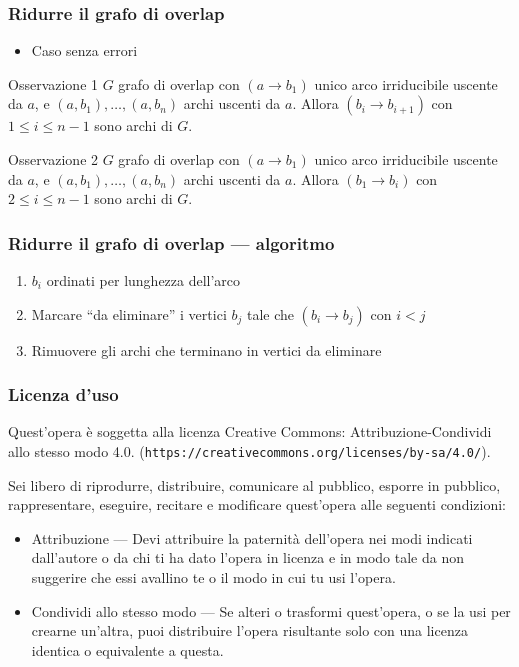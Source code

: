 \begin{frame}[fragile]
\frametitle{Ridurre il grafo di overlap}
\begin{itemize}
\item
Caso senza errori
\end{itemize}

\begin{block}{Osservazione 1}
$G$ grafo di overlap con $(a\to b_{1})$ unico arco irriducibile uscente da $a$, e $(a, b_{1}), \ldots , (a,  b_{n})$ archi
uscenti da $a$.
Allora $(b_{i}\to b_{i+1})$ con $1\le i\le n-1$ sono archi di $G$.
\end{block}

\begin{block}{Osservazione 2}
$G$ grafo di overlap con $(a\to b_{1})$ unico arco irriducibile uscente da $a$, e $(a, b_{1}), \ldots , (a,  b_{n})$ archi
uscenti da $a$.
Allora $(b_{1}\to b_{i})$ con $2\le i\le n-1$ sono archi di $G$.
\end{block}
\end{frame}

\begin{frame}[fragile]
\frametitle{Ridurre il grafo di overlap --- algoritmo}
\begin{enumerate}
\item
$b_{i}$ ordinati per lunghezza dell'arco
\item
Marcare ``da eliminare'' i vertici $b_{j}$ tale che $(b_{i} \to b_{j})$ con $i<j$
\item
Rimuovere gli archi che terminano in vertici da eliminare
\end{enumerate}
\end{frame}

\begin{frame}[containsverbatim]\frametitle{Licenza d'uso}
  \small

  Quest'opera {\`e} soggetta alla licenza Creative Commons:
Attribuzione-Condividi allo stesso modo 4.0.
  (\verb+https://creativecommons.org/licenses/by-sa/4.0/+).

Sei libero di riprodurre, distribuire, comunicare al pubblico, esporre
in pubblico, rappresentare, eseguire, recitare e modificare quest'opera
alle seguenti condizioni:
\begin{itemize}
\item
Attribuzione — Devi attribuire la paternit{\`a} dell'opera nei modi
indicati dall'autore o da chi ti ha dato l'opera in licenza e in modo tale da
non suggerire che essi avallino te o il modo in cui tu usi l'opera.
\item
Condividi allo stesso modo — Se alteri o trasformi quest'opera, o se
la usi per crearne un'altra, puoi distribuire l'opera risultante solo con
una licenza identica o equivalente a  questa.
\end{itemize}
\end{frame}


